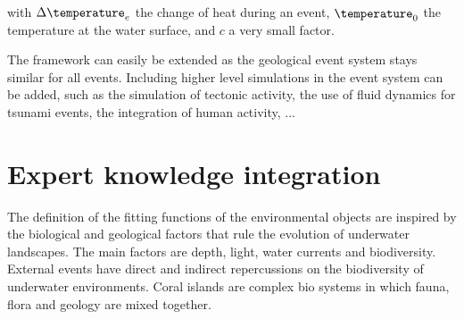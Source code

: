 with $\Delta \temperature_e$ the change of heat during an event, $\temperature_0$ the temperature at the water surface, and $c$ a very small factor.

The framework can easily be extended as the geological event system stays similar for all events. Including higher level simulations in the event system can be added, such as the simulation of tectonic activity, the use of fluid dynamics for tsunami events, the integration of human activity, ...

\section{Expert knowledge integration}
\label{EnvironmentObjects-sec:biology}
  The definition of the fitting functions of the environmental objects are inspired by the biological and geological factors that rule the evolution of underwater landscapes. The main factors are depth, light, water currents and biodiversity. External events have direct and indirect repercussions on the biodiversity of underwater environments. Coral islands are complex bio systems in which fauna, flora and geology are mixed together. 

